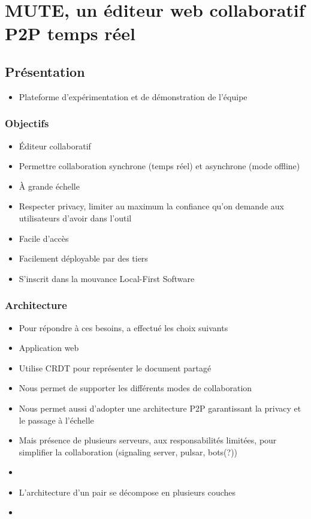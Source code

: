 \documentclass[12pt]{thesul}
\begin{document}
% 

\NumberThisInToc
\chapter{MUTE, un éditeur web collaboratif P2P temps réel}
\minitoc
\section{Présentation}

\begin{itemize}
  \item Plateforme d'expérimentation et de démonstration de l'équipe
\end{itemize}

\subsection{Objectifs}

\begin{itemize}
  \item Éditeur collaboratif
  \item Permettre collaboration synchrone (temps réel) et asynchrone (mode offline)
  \item À grande échelle
  \item Respecter privacy, limiter au maximum la confiance qu'on demande aux utilisateurs d'avoir dans l'outil
  \item Facile d'accès
  \item Facilement déployable par des tiers
  \item S'inscrit dans la mouvance Local-First Software \cite{localfirstsoftware2019,pushpin2020}
\end{itemize}

\subsection{Architecture}

\begin{itemize}
  \item Pour répondre à ces besoins, a effectué les choix suivants
  \item Application web
  \item Utilise CRDT pour représenter le document partagé
  \item Nous permet de supporter les différents modes de collaboration
  \item Nous permet aussi d'adopter une architecture P2P garantissant la privacy et le passage à l'échelle
  \item Mais présence de plusieurs serveurs, aux responsabilités limitées, pour simplifier la collaboration (signaling server, pulsar, bots(?))
  \item {}
  \item L'architecture d'un pair se décompose en plusieurs couches
  \item {}
\end{itemize}
\end{document}
